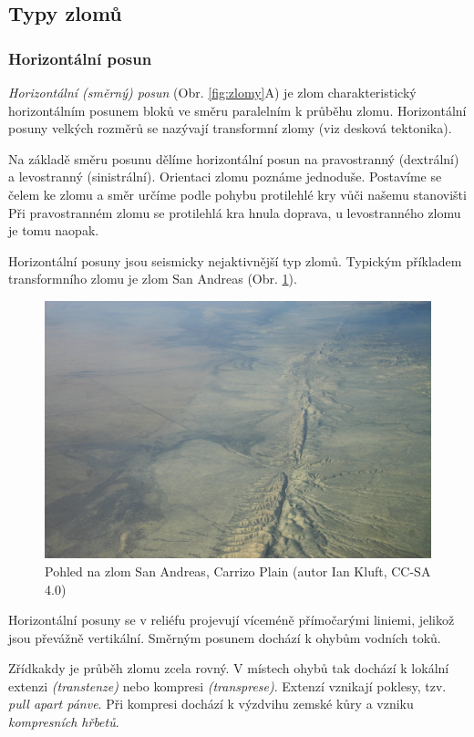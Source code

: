 \subsection{Typy zlomů}
\subsubsection{Horizontální posun}
\emph{Horizontální (směrný) posun} (Obr. \ref{fig:zlomy}A) je zlom charakteristický horizontálním posunem bloků ve směru paralelním k průběhu zlomu. Horizontální posuny velkých rozměrů se nazývají transformní zlomy (viz desková tektonika).

Na základě směru posunu dělíme horizontální posun na pravostranný (dextrální) a levostranný (sinistrální). Orientaci zlomu poznáme jednoduše. Postavíme se čelem ke zlomu a směr určíme podle pohybu protilehlé kry vůči našemu stanovišti Při pravostranném zlomu se protilehlá kra hnula doprava, u levostranného zlomu je tomu naopak. 

Horizontální posuny jsou seismicky nejaktivnější typ zlomů. Typickým příkladem transformního zlomu je zlom San Andreas (Obr. \ref{fig:san_andreas}).

\begin{figure}
	\centering
	\includegraphics[width=1\linewidth]{obrazky/tectonic/san_andreas}
	\caption{Pohled na zlom San Andreas, Carrizo Plain (autor Ian Kluft, CC-SA 4.0)}
	\label{fig:san_andreas}
\end{figure}

Horizontální posuny se v reliéfu projevují víceméně přímočarými liniemi, jelikož jsou převážně vertikální. Směrným posunem dochází k ohybům vodních toků. 

Zřídkakdy je průběh zlomu zcela rovný. V místech ohybů tak dochází k lokální extenzi \emph{(transtenze)} nebo kompresi \emph{(transprese)}. Extenzí vznikají poklesy, tzv. \emph{pull apart pánve}. Při kompresi dochází k výzdvihu zemské kůry a vzniku \emph{kompresních hřbetů}.

